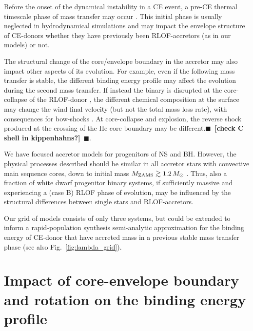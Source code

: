 \documentclass[twocolumn,twocolappendix,trackchanges]{aastex63}
\DeclareRobustCommand{\Figref}[1]{Fig.~\ref{#1}}
\newcommand{\todo}[1]{{\large $\blacksquare$~\textbf{\color{red}[#1]}}~$\blacksquare$}
\begin{document}
Before the onset of the
dynamical instability in a CE event, a pre-CE thermal timescale phase
of mass transfer may occur \citep[e.g.,][]{hjellming:1987, pejcha:17,
  blagorodnova:2021}. This initial phase is usually neglected in
hydrodynamical simulations and may impact the envelope structure of
CE-donors whether they have previously been RLOF-accretors (as in our
models) or not.

The structural change of the core/envelope boundary in the accretor
may also impact other aspects of its evolution. For example, even if
the following mass transfer is stable, the different binding energy
profile may affect the evolution during the second mass transfer. If
instead the binary is disrupted at the core-collapse of the RLOF-donor
\citep[e.g.,][]{blaauw:1961, renzo:2019walk}, the different chemical
composition at the surface \citep[e.g.,][]{blaauw:93, renzo:2021zoph}
may change the wind final velocity (but not the total mass loss rate),
with consequences for bow-shocks \citep[e.g.,][]{bodensteiner:18,
  moutzouri:22}. At core-collapse and explosion, the reverse shock
produced at the crossing of the He core boundary may be
different.\todo{check C shell in kippenhahns?}.

We have focused accretor models for progenitors of NS and BH. However,
the physical processes described should be similar in all accretor
stars with convective main sequence cores, down to initial mass
$M_{\rm ZAMS}\gtrsim 1.2\,M_\odot$ \citep[see also][]{wang:20}.
Thus, also a fraction of white dwarf progenitor binary systems, if
sufficiently massive and experiencing a (case B) RLOF phase of
evolution, may be influenced by the structural differences between
single stars and RLOF-accretors.

Our grid of models consists of only three systems, but could be
extended to inform a rapid-population synthesis semi-analytic
approximation for the binding energy of CE-donor that have accreted
mass in a previous stable mass transfer phase (see also \Figref{fig:lambda_grid}).



\appendix

\section{Impact of core-envelope boundary and rotation on the binding  energy profile}
\label{sec:toy_models}
\end{document}
